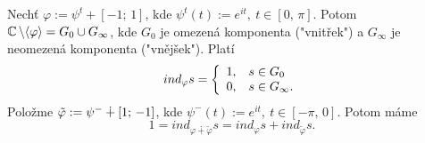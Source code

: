 \begin{example}
Nechť $\varphi:=\psi^t+[-1;\,1]$, kde $\psi^t(t):=e^{it},\ t\in[0,\,\pi]$. Potom $\operatorname{\mathbb{C}} \backslash\langle{\varphi}\rangle=G_0\cup{G_\infty}$, kde $G_0$ je omezená komponenta ("vnitřek") a $G_\infty$ je neomezená komponenta ("vnějšek"). Platí
$${ind}_\varphi{s}=
\left\{
\begin{array}{ll}
1, \hspace{3mm} s\in{G_0}\\
0, \hspace{3mm} s\in{G_\infty}.
\end{array}
\right.$$
Položme $\Tilde{\varphi}:=\psi^-\dotplus[1;\,-1]$,
kde $\psi^-(t):=e^{it},\ t\in[-\pi,\,0]$. Potom máme 
$$1={ind}_{\varphi\dotplus\tilde\varphi}{s}={ind}_\varphi{s}+{ind}_{\tilde{\varphi}}{s}.$$
\end{example}

